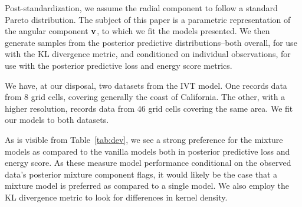 \begin{algorithm}
  \label{algo:processing}
  Subset ${\bf r},{\bf v}$ such that $r_i \geq 1$ for all $r_i\in {\bf r}$.\\
  \If{declustering}{
    \For{$i = 1,\ldots,n$}{
      If $r_i \geq 1$ and $r_{i-1} \geq 1$, drop the lesser (and associated $v_i$) from dataset.
    }
\end{algorithm}

Post-standardization, we assume the radial component to follow a standard Pareto distribution.  The
  subject of this paper is a parametric representation of the angular component ${\bf v}$, to which
  we fit the models presented.  We then generate samples from the posterior predictive
  distributions--both overall, for use with the KL divergence metric, and conditioned on individual
  observations, for use with the posterior predictive loss and energy score metrics.

We have, at our disposal, two datasets from the IVT model.  One records data from 8 grid cells,
  covering generally the coast of California.  The other, with a higher resolution, records data
  from 46 grid cells covering the same area.  We fit our models to both datasets.

\begin{table}[h]
  \label{tab:dev}
  
\end{table}

As is visible from Table~\ref{tab:dev}, we see a strong preference for the mixture models as
  compared to the vanilla models both in posterior predictive loss and energy score.  As these
  measure model performance conditional on the observed data's posterior mixture component flags,
  it would likely be the case that a mixture model is preferred as compared to a single model.  We
  also employ the KL divergence metric to look for differences in kernel density.

